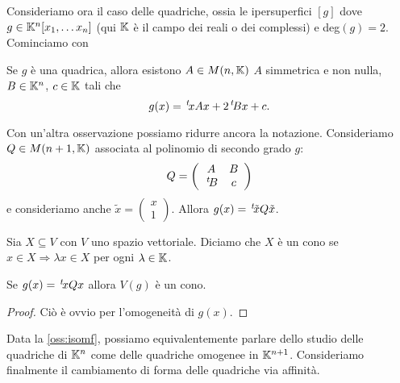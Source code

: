 Consideriamo ora il caso delle quadriche, ossia le ipersuperfici $[g]$ dove $g\in \mathbb K^n[x_1,\dots x_n]$
(qui $\mathbb K$ è il campo dei reali o dei complessi) e deg$(g)=2$. Cominciamo con
\begin{remark}
	Se $g$ è una quadrica, allora esistono $A\in M(n,\mathbb K)$ $A$ simmetrica e non nulla, $B\in \mathbb K^n$, $c\in \mathbb K$ tali che
	\[
		g(x) = \, ^{t}\!xAx+2\, ^{t}\!Bx+c.
	\]
\end{remark}

\begin{remark}\label{oss:isomf}
	Con un'altra osservazione possiamo ridurre ancora la notazione. Consideriamo $Q\in M(n+1,\mathbb K)$ associata al polinomio di secondo grado $g$:
	\[
		Q=\left(
			\begin{array}{cc}
			A & B\\
			\, ^{t}\!B & c
			\end{array}
		\right)
	\]
	e consideriamo anche $\tilde{x} =\left(\begin{smallmatrix}
x \\
1
\end{smallmatrix}
\right)$. Allora $g(x)=\, ^{t}\!\tilde{x}Q\tilde{x}$.
\end{remark}

\begin{definition}[Cono]
	Sia $X\subseteq V$ con $V$ uno spazio vettoriale. Diciamo che $X$ è un cono se $x\in X\Rightarrow \lambda x\in X$ per ogni $\lambda \in \mathbb K$.
\end{definition}
\begin{lemma}
	Se $g(x)=\, ^{t}\!xQx$ allora $V(g)$ è un cono.
\end{lemma}
\begin{proof}
	Ciò è ovvio per l'omogeneità di $g(x)$.
\end{proof}

Data la \cref{oss:isomf}, possiamo equivalentemente parlare dello studio delle quadriche di $\mathbb K^n$ come delle quadriche omogenee in $\mathbb K^{n+1}$.
Consideriamo finalmente il cambiamento di forma delle quadriche via affinità.

